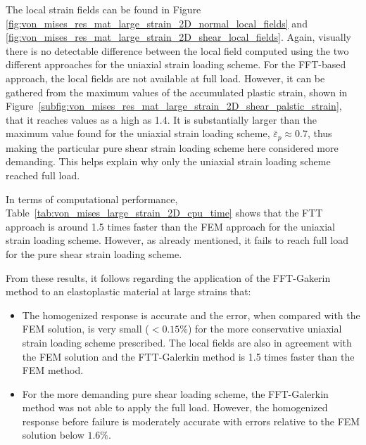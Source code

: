 The local strain fields can be found in Figure \ref{fig:von_mises_res_mat_large_strain_2D_normal_local_fields} and \ref{fig:von_mises_res_mat_large_strain_2D_shear_local_fields}.
Again, visually there is no detectable difference between the local field computed using the two different approaches for the uniaxial strain loading scheme.
For the FFT-based approach, the local fields are not available at full load.
However, it can be gathered from the maximum values of the accumulated plastic strain, shown in Figure~\ref{subfig:von_mises_res_mat_large_strain_2D_shear_palstic_strain}, that it reaches values as a high as 1.4.
It is substantially larger than the maximum value found for the uniaxial strain loading scheme, \(\bar{\varepsilon}_p\approx 0.7\), thus making the particular pure shear strain loading scheme here considered more demanding.
This helps explain why only the uniaxial strain loading scheme reached full load.

In terms of computational performance, Table~\ref{tab:von_mises_large_strain_2D_cpu_time} shows that the FTT approach is around 1.5 times faster than the FEM approach for the uniaxial strain loading scheme.
However, as already mentioned, it fails to reach full load for the pure shear strain loading scheme.

From these results, it follows regarding the application of the FFT-Gakerin method to an elastoplastic material at large strains that:
\begin{itemize}
  \item The homogenized response is accurate and the error, when compared with the FEM solution, is very small (\(<0.15\%\)) for the more conservative uniaxial strain loading scheme prescribed.
  The local fields are also in agreement with the FEM solution and the FTT-Galerkin method is 1.5 times faster than the FEM method.
  \item For the more demanding pure shear loading scheme, the FFT-Galerkin method was not able to apply the full load.
  However, the homogenized response before failure is moderately accurate with errors relative to the FEM solution below \(1.6\%\).
\end{itemize}

